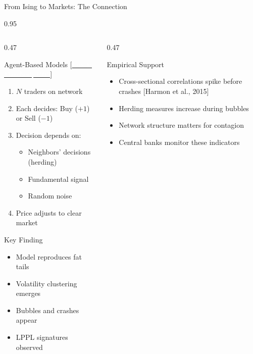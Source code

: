\documentclass[9pt, aspectratio=169, t]{beamer}
\begin{document}
\begin{frame}{From Ising to Markets: The Connection}
    \begin{cminipage}{0.95\textwidth}
    {\scriptsize
    \begin{columns}[T]
        \begin{column}{0.47\textwidth}
            \begin{block}{Agent-Based Models {\scriptsize[\href{https://doi.org/10.1038/17290}{\textcolor{white}{Lux \& Marchesi, 1999}}]}}
                \begin{enumerate}\setlength{\itemsep}{1pt}
                    \item $N$ traders on network
                    \item Each decides: Buy ($+1$) or Sell ($-1$)
                    \item Decision depends on:
                    \begin{itemize}\setlength{\itemsep}{0pt}
                        \item Neighbors' decisions (herding)
                        \item Fundamental signal
                        \item Random noise
                    \end{itemize}
                    \item Price adjusts to clear market
                \end{enumerate}
            \end{block}

            \begin{alertblock}{Key Finding}
                \begin{itemize}\setlength{\itemsep}{0pt}
                    \item Model reproduces fat tails
                    \item Volatility clustering emerges
                    \item Bubbles and crashes appear
                    \item LPPL signatures observed
                \end{itemize}
            \end{alertblock}
        \end{column}
        \begin{column}{0.47\textwidth}
            \begin{exampleblock}{Empirical Support}
                \begin{itemize}\setlength{\itemsep}{0pt}
                    \item Cross-sectional correlations spike before crashes [Harmon et al., 2015]
                    \item Herding measures increase during bubbles
                    \item Network structure matters for contagion
                    \item Central banks monitor these indicators
                \end{itemize}
            \end{exampleblock}


\end{column}
\end{columns}}
\end{cminipage}
\end{frame}
\end{document}
